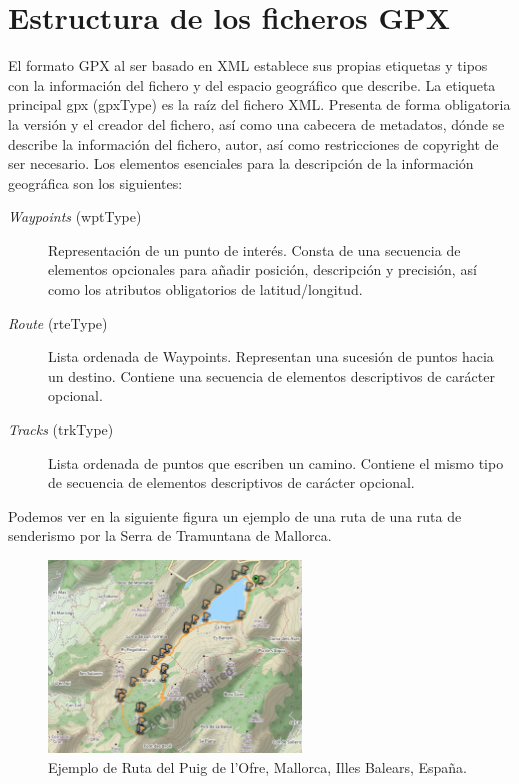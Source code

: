 \section{Estructura de los ficheros \ac{GPX}}
El formato \ac{GPX} al ser basado en \ac{XML} establece sus propias etiquetas y tipos con la información 
del fichero y del espacio geográfico que describe. La etiqueta principal gpx (gpxType) es la raíz del 
fichero \ac{XML}. Presenta de forma obligatoria la versión y el creador del fichero, así como una cabecera 
de metadatos, dónde se describe la información del fichero, autor, así como restricciones de copyright 
de ser necesario. Los elementos esenciales para la descripción de la información geográfica son los siguientes:
\begin{description}
\item[\textit{Waypoints} (wptType)] Representación de un punto de interés. Consta de una secuencia de elementos 
opcionales para añadir posición, descripción y precisión, así como los atributos obligatorios de latitud/longitud.
\item[\textit{Route} (rteType)] Lista ordenada de Waypoints.  Representan una sucesión de puntos hacia un destino. 
Contiene una secuencia de elementos descriptivos de carácter opcional.
\item[\textit{Tracks} (trkType)] Lista ordenada de puntos que escriben un camino. Contiene el mismo tipo de 
secuencia de elementos descriptivos de carácter opcional.
\end{description}

Podemos ver en la siguiente figura un ejemplo de  una ruta de una ruta de senderismo por la Serra de Tramuntana
de Mallorca.

\begin{figure}[htb]
\begin{center}
\includegraphics[width=0.6\textwidth]{./Imagenes/RutaOfre.png}
\caption{Ejemplo de Ruta del Puig de l'Ofre, Mallorca, Illes Balears, España.}
\label{fig:PointGeneration02}
\end{center}
\end{figure}

